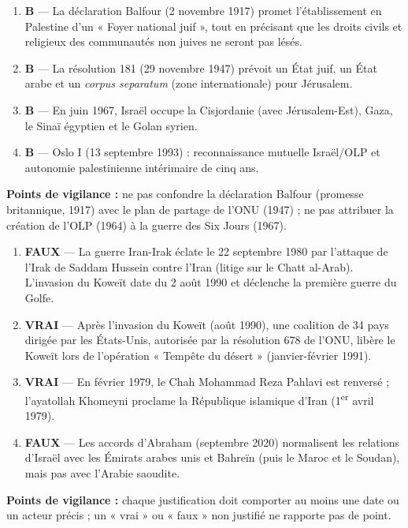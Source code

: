 \documentclass[11pt]{article}
\begin{document}
\begin{corrige}
\begin{enumerate}
    \item \textbf{B} — La déclaration Balfour (2 novembre 1917) promet l'établissement en Palestine d'un « Foyer national juif », tout en précisant que les droits civils et religieux des communautés non juives ne seront pas lésés.
    \item \textbf{B} — La résolution 181 (29 novembre 1947) prévoit un État juif, un État arabe et un \emph{corpus separatum} (zone internationale) pour Jérusalem.
    \item \textbf{B} — En juin 1967, Israël occupe la Cisjordanie (avec Jérusalem-Est), Gaza, le Sinaï égyptien et le Golan syrien.
    \item \textbf{B} — Oslo I (13 septembre 1993) : reconnaissance mutuelle Israël/OLP et autonomie palestinienne intérimaire de cinq ans.
\end{enumerate}
\textbf{Points de vigilance :} ne pas confondre la déclaration Balfour (promesse britannique, 1917) avec le plan de partage de l'ONU (1947) ; ne pas attribuer la création de l'OLP (1964) à la guerre des Six Jours (1967).
\end{corrige}

\begin{corrige}
\begin{enumerate}
    \item \textbf{FAUX} — La guerre Iran-Irak éclate le 22 septembre 1980 par l'attaque de l'Irak de Saddam Hussein contre l'Iran (litige sur le Chatt al-Arab). L'invasion du Koweït date du 2 août 1990 et déclenche la première guerre du Golfe.
    \item \textbf{VRAI} — Après l'invasion du Koweït (août 1990), une coalition de 34 pays dirigée par les États-Unis, autorisée par la résolution 678 de l'ONU, libère le Koweït lors de l'opération « Tempête du désert » (janvier-février 1991).
    \item \textbf{VRAI} — En février 1979, le Chah Mohammad Reza Pahlavi est renversé ; l'ayatollah Khomeyni proclame la République islamique d'Iran (1\textsuperscript{er} avril 1979).
    \item \textbf{FAUX} — Les accords d'Abraham (septembre 2020) normalisent les relations d'Israël avec les Émirats arabes unis et Bahreïn (puis le Maroc et le Soudan), mais pas avec l'Arabie saoudite.
\end{enumerate}
\textbf{Points de vigilance :} chaque justification doit comporter au moins une date ou un acteur précis ; un « vrai » ou « faux » non justifié ne rapporte pas de point.
\end{corrige}
\end{document}
